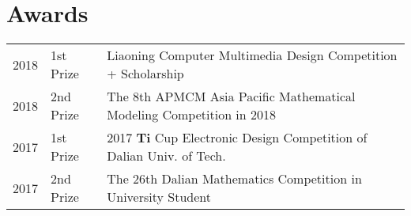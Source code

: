 \documentclass[]{deedy-resume-openfont}
\begin{document}
\begin{minipage}[t]{0.73\textwidth}


\section{Awards} 
\begin{tabular}{rll}
2018	     & 1st Prize  & Liaoning Computer Multimedia Design Competition + Scholarship \\
2018         & 2nd Prize  & The 8th APMCM Asia Pacific Mathematical Modeling Competition in 2018 \\
2017	     & 1st Prize  & 2017 \textbf{Ti} Cup Electronic Design Competition of Dalian Univ. of Tech. \\
2017         & 2nd Prize  & The 26th Dalian Mathematics Competition in University Student \\
\end{tabular}
\sectionsep


% 
% 

\end{minipage} 
\end{document}
